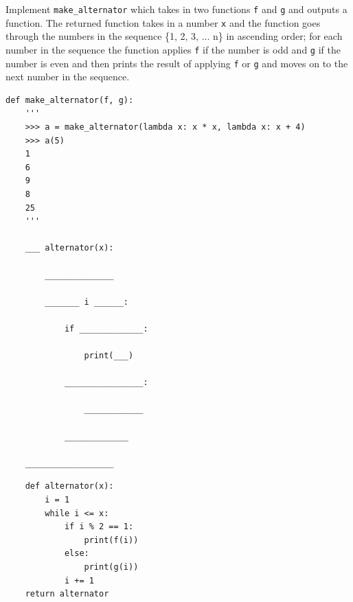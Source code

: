 \begin{blocksection}
\question Implement \lstinline$make_alternator$ which takes in two functions \texttt{f} and \texttt{g} and outputs a function. The returned function takes in a number \texttt{x} and the function goes through the numbers in the sequence \{1, 2, 3, ... n\} in ascending order; for each number in the sequence the function applies \texttt{f} if the number is odd and \texttt{g} if the number is even and then prints the result of applying \texttt{f} or \texttt{g} and moves on to the next number in the sequence.  

\begin{lstlisting}
def make_alternator(f, g):
    '''
    >>> a = make_alternator(lambda x: x * x, lambda x: x + 4)
    >>> a(5)
    1
    6
    9
    8
    25
    '''

    ___ alternator(x):

        ______________

        _______ i ______:

            if _____________:

                print(___)

            ________________:

                ____________

            _____________

    __________________

\end{lstlisting}

\begin{solution}[1.5in]
\begin{lstlisting}
    def alternator(x):
        i = 1
        while i <= x:
            if i % 2 == 1:
                print(f(i))
            else:
                print(g(i))
            i += 1
    return alternator
\end{lstlisting}
\end{solution}

\end{blocksection}
